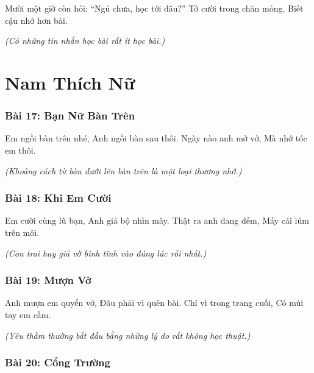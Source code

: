 \documentclass[14pt,a4paper,twoside]{extbook}
\begin{document}
Mười một giờ còn hỏi:
``Ngủ chưa, học tới đâu?''
Tớ cười trong chăn mỏng,
Biết cậu nhớ hơn bài.

\vspace{1.5cm}\noindent
\textit{(Có những tin nhắn học bài rất ít học bài.)}

\newpage

\part{Nam Thích Nữ}

\section*{Bài 17: Bạn Nữ Bàn Trên}

Em ngồi bàn trên nhé,
Anh ngồi bàn sau thôi.
Ngày nào anh mở vở,
Mà nhớ tóc em thôi.

\vspace{1.5cm}\noindent
\textit{(Khoảng cách từ bàn dưới lên bàn trên là một loại thương nhớ.)}

\vspace{2cm}

\section*{Bài 18: Khi Em Cười}

Em cười cùng lũ bạn,
Anh giả bộ nhìn mây.
Thật ra anh đang đếm,
Mấy cái lúm trên môi.

\vspace{1.5cm}\noindent
\textit{(Con trai hay giả vờ bình tĩnh vào đúng lúc rối nhất.)}

\vspace{2cm}

\section*{Bài 19: Mượn Vở}

Anh mượn em quyển vở,
Đâu phải vì quên bài.
Chỉ vì trong trang cuối,
Có mùi tay em cầm.

\vspace{1.5cm}\noindent
\textit{(Yêu thầm thường bắt đầu bằng những lý do rất không học thuật.)}

\vspace{2cm}

\section*{Bài 20: Cổng Trường}
\end{document}

